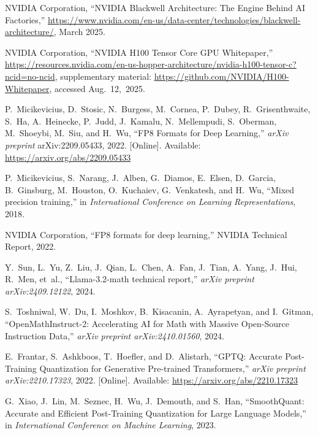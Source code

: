 \documentclass[conference]{IEEEtran}
\begin{document}
\begin{thebibliography}{30}
NVIDIA Corporation, ``NVIDIA Blackwell Architecture: The Engine Behind AI Factories,'' 
\url{https://www.nvidia.com/en-us/data-center/technologies/blackwell-architecture/}, 
March 2025.

NVIDIA Corporation, ``NVIDIA H100 Tensor Core GPU Whitepaper,'' 
\url{https://resources.nvidia.com/en-us-hopper-architecture/nvidia-h100-tensor-c?ncid=no-ncid}, 
supplementary material: \url{https://github.com/NVIDIA/H100-Whitepaper}, accessed Aug.~12,~2025.

P.~Micikevicius, D.~Stosic, N.~Burgess, M.~Cornea, P.~Dubey, R.~Grisenthwaite, 
S.~Ha, A.~Heinecke, P.~Judd, J.~Kamalu, N.~Mellempudi, S.~Oberman, 
M.~Shoeybi, M.~Siu, and H.~Wu, 
``FP8 Formats for Deep Learning,'' 
\emph{arXiv preprint} arXiv:2209.05433, 2022. 
[Online]. Available: \url{https://arxiv.org/abs/2209.05433}

P.~Micikevicius, S.~Narang, J.~Alben, G.~Diamos, E.~Elsen, D.~Garcia, B.~Ginsburg, M.~Houston, O.~Kuchaiev, G.~Venkatesh, and H.~Wu,
``Mixed precision training,''
in \emph{International Conference on Learning Representations}, 2018.

NVIDIA Corporation,
``FP8 formats for deep learning,''
NVIDIA Technical Report, 2022.

Y.~Sun, L.~Yu, Z.~Liu, J.~Qian, L.~Chen, A.~Fan, J.~Tian, A.~Yang, J.~Hui, R.~Men, et~al.,
``Llama-3.2-math technical report,''
\emph{arXiv preprint arXiv:2409.12122}, 2024.

S.~Toshniwal, W.~Du, I.~Moshkov, B.~Kisacanin, A.~Ayrapetyan, and I.~Gitman, 
``OpenMathInstruct-2: Accelerating AI for Math with Massive Open-Source Instruction Data,'' 
\emph{arXiv preprint arXiv:2410.01560}, 2024.

E.~Frantar, S.~Ashkboos, T.~Hoefler, and D.~Alistarh,
``GPTQ: Accurate Post-Training Quantization for Generative Pre-trained Transformers,''
\emph{arXiv preprint arXiv:2210.17323}, 2022. 
[Online]. Available: \url{https://arxiv.org/abs/2210.17323}

G.~Xiao, J.~Lin, M.~Seznec, H.~Wu, J.~Demouth, and S.~Han,
``SmoothQuant: Accurate and Efficient Post-Training Quantization for Large Language Models,''
in \emph{International Conference on Machine Learning}, 2023.


\end{thebibliography}
\end{document}
